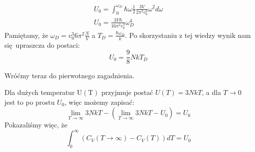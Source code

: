 \documentclass[12pt,a4paper]{article}
\begin{document}
$$
\begin{gathered}
U_{0}=\int_{0}^{\omega_{D}} \hbar \omega \frac{1}{2} \frac{3 V}{2 \pi^{2} v_{0}^{3}} \omega^{2} d \omega \\
U_{0}=\frac{3 V \hbar}{16 \pi^{2} v_{0}^{3}} \omega_{D}^{4}
\end{gathered}
$$
Pamiętamy, że $\omega_{D}=v_{0}^{3} 6 \pi^{2} \frac{N}{V}$ a $T_{D}=\frac{\hbar \omega_{D}}{k}$. Po skorzystaniu z tej wiedzy wynik nam się upraszcza do postaci:
$$
U_{0}=\frac{9}{8} N k T_{D}
$$

Wróćmy teraz do pierwotnego zagadnienia.

Dla dużych temperatur $\mathrm{U}(\mathrm{T})$ przyjmuje postać $U(T)=3 N k T$, a dla $T \rightarrow 0$ jest to po prostu $U_{0}$, więc możemy zapisać:
$$
\lim _{T \rightarrow \infty} 3 N k T-\left(\lim _{T \rightarrow \infty} 3 N k T-U_{0}\right)=U_{0}
$$
Pokazaliśmy więc, że
$$
\int_{0}^{\infty}\left(C_{V}(T \rightarrow \infty)-C_{V}(T)\right) d T=U_{0}
$$
\end{document}
